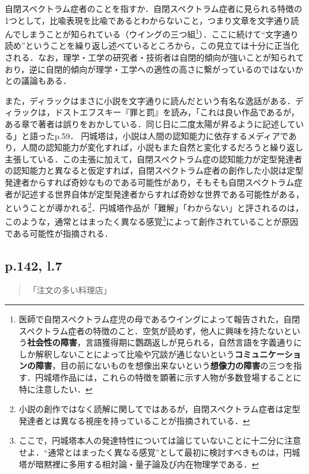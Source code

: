 \documentclass[10pt, a5paper, twoside]{ltjsarticle}
\begin{document}
            自閉スペクトラム症者のことを指すか．自閉スペクトラム症者に見られる特徴の1つとして，比喩表現を比喩であるとわからないこと，つまり文章を文字通り読んでしまうことが知られている（ウイングの三つ組\footnote{医師で自閉スペクトラム症児の母であるウイングによって報告\cite{wing}された，自閉スペクトラム症者の特徴のこと．空気が読めず，他人に興味を持たないという\textbf{社会性の障害}，言語獲得期に鸚鵡返しが見られる，自然言語を字義通りにしか解釈しないことによって比喩や冗談が通じないという\textbf{コミュニケーションの障害}，目の前にないものを想像出来ないという\textbf{想像力の障害}の三つを指す\cite{hongo}．円城塔作品には，これらの特徴を顕著に示す人物が多数登場することに特に注意したい．}）．ここに続けて“文字通り読め”ということを繰り返し述べているところから，この見立ては十分に正当化される．なお，理学・工学の研究者・技術者は自閉的傾向が強いことが知られており，逆に自閉的傾向が理学・工学への適性の高さに繋がっているのではないかとの議論もある\cite{buchen}．

            また，ディラックはまさに小説を文字通りに読んだという有名な逸話がある．ディラックは，ドストエフスキー『罪と罰』を読み，「これは良い作品であるが，ある章で著者は誤りをおかしている．同じ日に二度太陽が昇るように記述している」と語った\cite{dirac}p.59．
            円城塔は，小説は人間の認知能力に依存するメディアであり，人間の認知能力が変化すれば，小説もまた自然と変化するだろうと繰り返し主張している\cite{interview1,interview2}．この主張に加えて，自閉スペクトラム症の認知能力が定型発達者の認知能力と異なると仮定すれば，自閉スペクトラム症者の創作した小説は定型発達者からすれば奇妙なものである可能性があり，そもそも自閉スペクトラム症者が記述する世界自体が定型発達者からすれば奇妙な世界である可能性がある，ということが導かれる\footnote{小説の創作ではなく読解に関してではあるが，自閉スペクトラム症者は定型発達者とは異なる視座を持っていることが指摘されている\cite{savarese}．}．円城塔作品が「難解」「わからない」と評されるのは，このような，通常とはまったく異なる感覚\footnote{ここで，円城塔本人の発達特性については論じていないことに十二分に注意せよ．“通常とはまったく異なる感覚”として最初に検討すべきものは，円城塔が暗黙裡に多用する相対論・量子論及び内在物理学である．}によって創作されていることが原因である可能性が指摘される．

        \subsection{p.142, l.7}

            \begin{quote}
                「注文の多い料理店」
            \end{quote}
\end{document}
